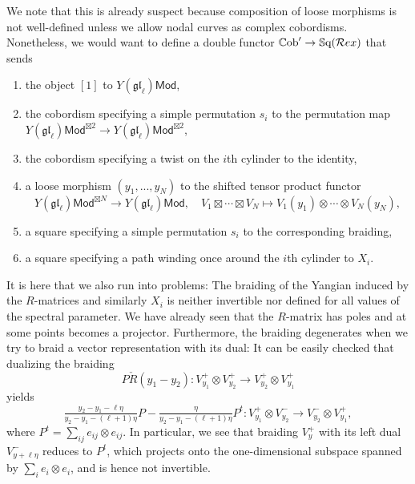 \documentclass[11pt]{report}
\theoremstyle{definition}
\theoremstyle{remark}
\theoremstyle{remark}
\begin{document}
We note that this is already suspect because composition of loose morphisms is not well-defined unless we allow nodal curves as complex cobordisms. Nonetheless, we would want to define a double functor $\mathbb{C}\textnormal{ob}' \to \mathbb{S}\textnormal{q}(\mathcal{R}ex)$ that sends
\begin{enumerate}[label=(\roman*)]
\item the object $[1]$ to $Y(\mathfrak{gl}_\ell)\mathsf{Mod}$,
\item the cobordism specifying a simple permutation $s_i$ to the permutation map $Y(\mathfrak{gl}_\ell)\mathsf{Mod}^{\boxtimes 2} \to Y(\mathfrak{gl}_\ell)\mathsf{Mod}^{\boxtimes 2}$,
\item the cobordism specifying a twist on the $i$th cylinder to the identity,
\item a loose morphism $(y_1,...,y_N)$ to the shifted tensor product functor
\begin{equation*}
Y(\mathfrak{gl}_\ell)\mathsf{Mod}^{\boxtimes N} \to Y(\mathfrak{gl}_\ell)\mathsf{Mod}, \quad V_1 \boxtimes \cdots \boxtimes V_N \mapsto V_1(y_1) \otimes \cdots \otimes V_N(y_N),
\end{equation*}
\item a square specifying a simple permutation $s_i$ to the corresponding braiding,
\item a square specifying a path winding once around the $i$th cylinder to $X_i$.
\end{enumerate}
It is here that we also run into problems: The braiding of the Yangian induced by the $R$-matrices and similarly $X_i$ is neither invertible nor defined for all values of the spectral parameter. We have already seen that the $R$-matrix has poles and at some points becomes a projector. Furthermore, the braiding degenerates when we try to braid a vector representation with its dual: It can be easily checked that dualizing the braiding
\begin{equation*}
P \check R(y_1-y_2): V_{y_1}^+ \otimes V_{y_2}^+ \to V_{y_2}^+ \otimes V_{y_1}^+
\end{equation*}
yields
\begin{equation*}
\tfrac{y_2-y_1-\ell\eta}{y_2-y_1-(\ell+1)\eta} P - \tfrac{\eta}{y_2-y_1-(\ell+1)\eta} P^t: V_{y_1}^+ \otimes V_{y_2}^- \to V_{y_2}^- \otimes V_{y_1}^+,
\end{equation*}
where $P^t = \sum_{ij} e_{ij} \otimes e_{ij}$. In particular, we see that braiding $V_y^+$ with its left dual $V_{y+\ell\eta}^-$ reduces to $P^t$, which projects onto the one-dimensional subspace spanned by $\sum_i e_i \otimes e_i$, and is hence not invertible.
\end{document}
